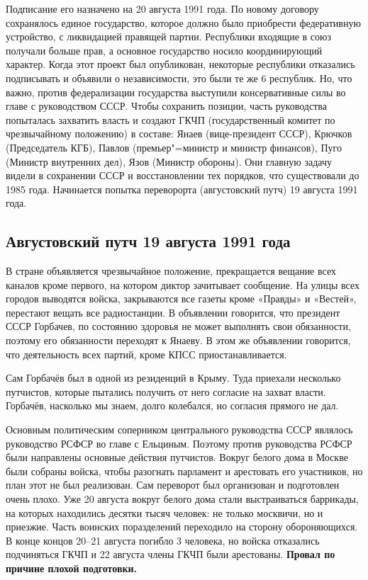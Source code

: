 Подписание его назначено на 20 августа 1991 года. По новому договору сохранялось единое государство, которое должно было приобрести федеративную устройство, с ликвидацией правящей партии. Республики входящие в союз получали больше прав, а основное государство носило координирующий характер. Когда этот проект был опубликован, некоторые республики отказались подписывать и объявили о независимости, это были те же 6 республик. Но, что важно, против федерализации государства выступили консервативные силы во главе с руководством СССР. Чтобы сохранить позиции, часть руководства попыталась захватить власть и создают ГКЧП (государственный комитет по чрезвычайному положению) в составе: Янаев (вице-президент СССР), Крючков (Председатель КГБ), Павлов (премьер"=министр и министр финансов), Пуго (Министр внутренних дел), Язов (Министр обороны). Они главную задачу видели в сохранении СССР и восстановлении тех порядков, что существовали до 1985 года. 
Начинается попытка переворорта (августовский путч) 19 августа 1991 года. 

\subsection{Августовский путч 19 августа 1991 года}

В стране объявляется чрезвычайное положение, прекращается вещание всех каналов кроме первого, на котором диктор зачитывает сообщение. На улицы всех городов выводятся войска, закрываются все газеты кроме «Правды» и «Вестей», перестают вещать все радиостанции. В объявлении говорится, что президент СССР Горбачев, по состоянию здоровья не может выполнять свои обязанности, поэтому его обязанности переходят к Янаеву. В этом же объявлении говорится, что деятельность всех партий, кроме КПСС приостанавливается.

Сам Горбачёв был в одной из резиденций в Крыму. Туда приехали несколько путчистов, которые пытались получить от него согласие на захват власти. Горбачёв, насколько мы знаем, долго колебался, но согласия прямого не дал.

Основным политическим соперником центрального руководства СССР являлось руководство РСФСР во главе с Ельциным. Поэтому против руководства РСФСР были направлены основные действия путчистов. Вокруг белого дома в Москве были собраны войска, чтобы разогнать парламент и арестовать его участников, но план этот не был реализован. Сам переворот был организован и подготовлен очень плохо. Уже 20 августа вокруг белого дома стали выстраиваться баррикады, на которых находились десятки тысяч человек: не только москвичи, но и приезжие. Часть воинских поразделений переходило на сторону обороняющихся. В конце концов 20--21 августа погибло 3 человека, но войска отказались подчиняться ГКЧП и 22 августа члены ГКЧП были арестованы. \textbf{Провал по причине плохой подготовки.}

